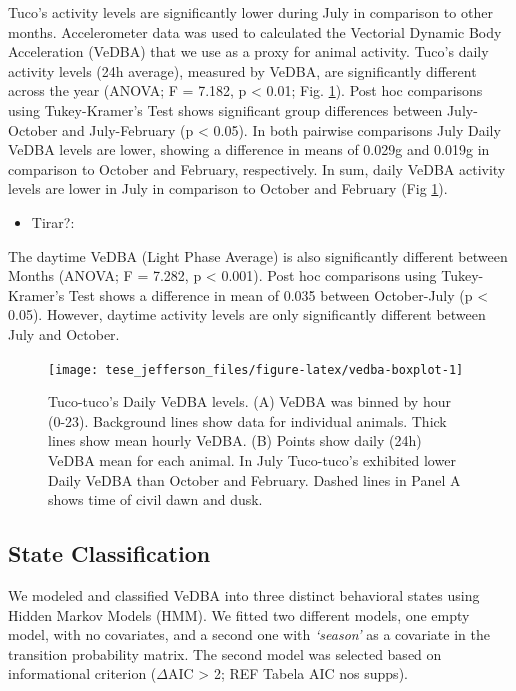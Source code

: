 \documentclass[english,msc,numbers,hidelinks]{coppe}
\providecommand{\tightlist}{%
  \setlength{\itemsep}{0pt}\setlength{\parskip}{0pt}}
\begin{document}
  Tuco's activity levels are significantly lower during July in comparison to other months. Accelerometer data was used to calculated the Vectorial Dynamic Body Acceleration (VeDBA) that we use as a proxy for animal activity. Tuco's daily activity levels (24h average), measured by VeDBA, are significantly different across the year (ANOVA; F = 7.182, p \textless{} 0.01; Fig. \ref{fig:vedba-boxplot}). Post hoc comparisons using Tukey-Kramer's Test shows significant group differences between July-October and July-February (p \textless{} 0.05). In both pairwise comparisons July Daily VeDBA levels are lower, showing a difference in means of 0.029g and 0.019g in comparison to October and February, respectively. In sum, daily VeDBA activity levels are lower in July in comparison to October and February (Fig \ref{fig:vedba-boxplot}).
  \begin{itemize}
  \tightlist
  \item
    Tirar?:
  \end{itemize}
  The daytime VeDBA (Light Phase Average) is also significantly different between Months (ANOVA; F = 7.282, p \textless{} 0.001). Post hoc comparisons using Tukey-Kramer's Test shows a difference in mean of 0.035 between October-July (p \textless{} 0.05). However, daytime activity levels are only significantly different between July and October.
  \begin{figure}

  {\centering \texttt{[image: tese\_jefferson\_files/figure-latex/vedba-boxplot-1]} 

  }

  \caption{Tuco-tuco's Daily VeDBA levels. (A) VeDBA was binned by hour (0-23). Background lines show data for individual animals. Thick lines show mean hourly VeDBA. (B) Points show daily (24h) VeDBA mean for each animal. In July Tuco-tuco's exhibited lower Daily VeDBA than October and February. Dashed lines in Panel A shows time of civil dawn and dusk.}\label{fig:vedba-boxplot}
  \end{figure}
  \hypertarget{state-classification}{%
  \subsection{State Classification}\label{state-classification}}

  We modeled and classified VeDBA into three distinct behavioral states using Hidden Markov Models (HMM). We fitted two different models, one empty model, with no covariates, and a second one with \emph{`season'} as a covariate in the transition probability matrix. The second model was selected based on informational criterion (\(\Delta\)AIC \textgreater{} 2; REF Tabela AIC nos supps).
\end{document}
